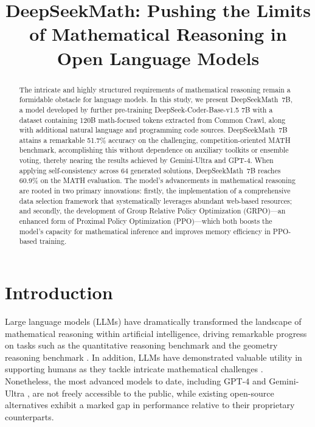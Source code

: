 \title{DeepSeekMath: Pushing the Limits of Mathematical Reasoning in Open Language Models}

\begin{abstract}
The intricate and highly structured requirements of mathematical reasoning remain a formidable obstacle for language models. In this study, we present DeepSeekMath~7B, a model developed by further pre-training DeepSeek-Coder-Base-v1.5 7B with a dataset containing 120B math-focused tokens extracted from Common Crawl, along with additional natural language and programming code sources. DeepSeekMath~7B attains a remarkable 51.7\% accuracy on the challenging, competition-oriented MATH benchmark, accomplishing this without dependence on auxiliary toolkits or ensemble voting, thereby nearing the results achieved by Gemini-Ultra and GPT-4. When applying self-consistency across 64 generated solutions, DeepSeekMath~7B reaches 60.9\% on the MATH evaluation. The model’s advancements in mathematical reasoning are rooted in two primary innovations: firstly, the implementation of a comprehensive data selection framework that systematically leverages abundant web-based resources; and secondly, the development of Group Relative Policy Optimization (GRPO)—an enhanced form of Proximal Policy Optimization (PPO)—which both boosts the model’s capacity for mathematical inference and improves memory efficiency in PPO-based training.
\end{abstract}

\section{Introduction}

Large language models (LLMs) have dramatically transformed the landscape of mathematical reasoning within artificial intelligence, driving remarkable progress on tasks such as the quantitative reasoning benchmark \citep{MATH} and the geometry reasoning benchmark \citep{trinh2024solving}. In addition, LLMs have demonstrated valuable utility in supporting humans as they tackle intricate mathematical challenges \citep{tao}. Nonetheless, the most advanced models to date, including GPT-4 \citep{gpt4} and Gemini-Ultra \citep{gemini}, are not freely accessible to the public, while existing open-source alternatives exhibit a marked gap in performance relative to their proprietary counterparts.

